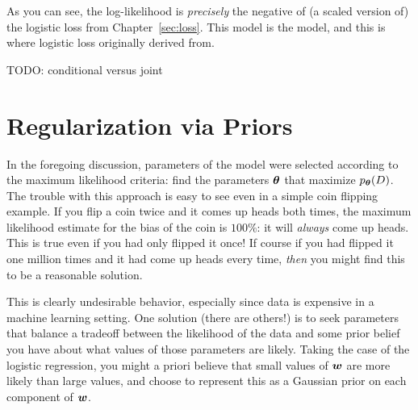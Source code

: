 As you can see, the log-likelihood is \emph{precisely} the negative of
(a scaled version of) the logistic loss from Chapter~\ref{sec:loss}.
This model is the  model, and this is
where logistic loss originally derived from.


TODO: conditional versus joint

\section{Regularization via Priors}

In the foregoing discussion, parameters of the model were selected
according to the maximum likelihood criteria: find the parameters
$\boldsymbol{\theta}$ that maximize $p_{\boldsymbol{\theta}}(D)$.  The trouble with this
approach is easy to see even in a simple coin flipping example.  If
you flip a coin twice and it comes up heads both times, the maximum
likelihood estimate for the bias of the coin is $100\%$: it will
\emph{always} come up heads.  This is true even if you had only
flipped it once!  If course if you had flipped it one million times
and it had come up heads every time, \emph{then} you might find this
to be a reasonable solution.

This is clearly undesirable behavior, especially since data is
expensive in a machine learning setting.  One solution (there are
others!) is to seek parameters that balance a tradeoff between the
likelihood of the data and some prior belief you have about what
values of those parameters are likely.  Taking the case of the
logistic regression, you might a priori believe that small values of
${\boldsymbol{w}}$ are more likely than large values, and choose to represent this
as a Gaussian prior on each component of ${\boldsymbol{w}}$.

